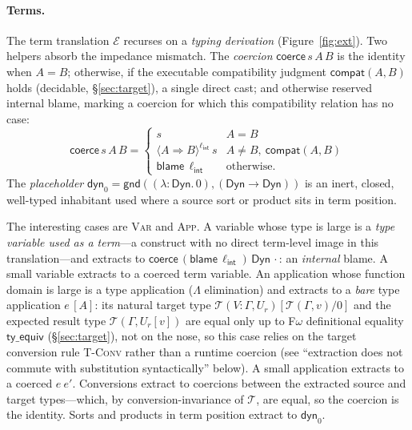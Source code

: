 \documentclass[acmsmall,anonymous=false,nonacm]{acmart}
\newcommand{\dyn}{\ensuremath{\mathsf{Dyn}}}
\newcommand{\cast}[4]{\langle #2 \Rightarrow #3 \rangle^{#4}\, #1}
\newcommand{\gnd}[2]{\mathsf{gnd}(#1, #2)}
\newcommand{\blame}[1]{\mathsf{blame}\,#1}
\newcommand{\ext}{\mathcal{E}}
\newcommand{\extt}{\mathcal{T}}
\newcommand{\coerce}[3]{\mathsf{coerce}\,#1\,#2\,#3}
\newcommand{\dyntoken}{\mathsf{dyn}_0}
\newcommand{\lint}{\ell_{\mathsf{int}}}
\begin{document}
\paragraph{Terms.}
The term translation $\ext$ recurses on a \emph{typing derivation}
(Figure~\ref{fig:ext}). Two helpers absorb the impedance mismatch. The
\emph{coercion} $\coerce{s}{A}{B}$ is the identity when $A = B$; otherwise, if
the executable compatibility judgment $\mathsf{compat}(A,B)$ holds (decidable,
\S\ref{sec:target}), a single direct cast; and otherwise reserved internal
blame, marking a coercion for which this compatibility relation has no case:
\[
\coerce{s}{A}{B} =
  \begin{cases}
    s & A = B \\
    \cast{s}{A}{B}{\lint} & A \neq B,\ \mathsf{compat}(A,B) \\
    \blame \lint & \text{otherwise.}
  \end{cases}
\]
The \emph{placeholder} $\dyntoken = \gnd{(\lambda{:}\dyn.\,0)}{(\dyn \to \dyn)}$
is an inert, closed, well-typed inhabitant used where a source sort or product
sits in term position.

The interesting cases are \textsc{Var} and \textsc{App}. A variable whose type
is large is a \emph{type variable used as a term}---a construct with no direct
term-level image in this translation---and extracts to
$\coerce{(\blame \lint)}{\dyn}{\cdot}$:
an \emph{internal} blame. A small variable extracts to a coerced term variable.
An application whose function domain is large is a type application ($\Lambda$
elimination) and extracts to a \emph{bare} type application $e\,[A]$: its
natural target type $\extt(V{:}\Gamma, U_r)[\extt(\Gamma,v)/0]$ and the expected
result type $\extt(\Gamma, U_r[v])$ are equal only up to F$\omega$ definitional
equality $\mathsf{ty\_equiv}$ (\S\ref{sec:target}), not on the nose, so this case
relies on the target conversion rule \textsc{T-Conv} rather than a runtime
coercion (see ``extraction does not commute with substitution syntactically''
below). A small application extracts to a coerced $e\ e'$. Conversions extract to
coercions between the extracted source and target types---which, by
conversion-invariance of $\extt$, are equal, so the coercion is the identity.
Sorts and products in term position extract to $\dyntoken$.
\end{document}
